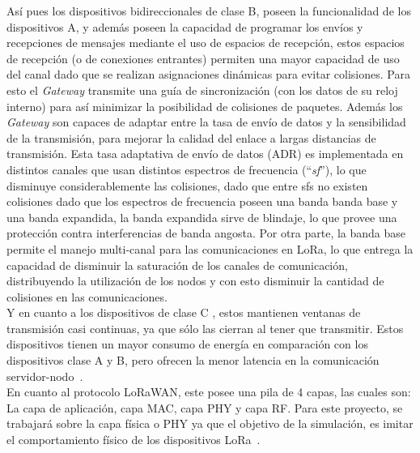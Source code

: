 \begin{justify}
Así pues los dispositivos bidireccionales de clase B, poseen la funcionalidad de los dispositivos A, y además poseen la capacidad de programar los envíos y recepciones de mensajes mediante el uso de espacios de recepción, estos espacios de recepción (o de conexiones entrantes) permiten una mayor capacidad de uso del canal dado que se realizan asignaciones dinámicas para evitar colisiones. Para esto el \textit{Gateway} transmite una guía de sincronización (con los datos de su reloj interno) para así minimizar la posibilidad de colisiones de paquetes. Además los \textit{Gateway} son capaces de adaptar entre la tasa de envío de datos y la sensibilidad de la transmisión, para mejorar la calidad del enlace a largas distancias de transmisión. Esta tasa adaptativa de envío de datos (ADR) es implementada en distintos canales que usan distintos espectros de frecuencia (``\textit{\gls{sf}}''), lo que disminuye considerablemente las colisiones, dado que entre \gls{sf}s no existen colisiones dado que los espectros de frecuencia poseen una banda banda base y una banda expandida, la banda expandida sirve de blindaje, lo que provee una protección contra interferencias de banda angosta. Por otra parte, la banda base permite el manejo multi-canal para las comunicaciones en LoRa, lo que entrega la capacidad de disminuir la saturación de los canales de comunicación, distribuyendo la utilización de los nodos y con esto disminuir la cantidad de colisiones en las comunicaciones.\\
Y en cuanto a los dispositivos de clase C , estos mantienen ventanas de transmisión casi continuas, ya que sólo las cierran al tener que transmitir. Estos dispositivos tienen un mayor consumo de energía en comparación con los dispositivos clase A y B, pero ofrecen la menor latencia en la comunicación servidor-nodo~\cite{Sornin}.\\
En cuanto al protocolo LoRaWAN, este posee una pila de 4 capas, las cuales son: La capa de aplicación, capa MAC, capa PHY y capa RF. Para este proyecto, se trabajará sobre la capa física o PHY ya que el objetivo de la simulación, es imitar el comportamiento físico de los dispositivos LoRa~\cite{Sornin2}.\\

\end{justify}

